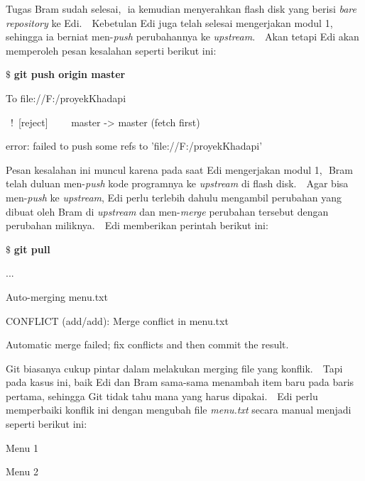 \noindent 
Tugas Bram sudah selesai, $  $ ia kemudian menyerahkan flash disk yang berisi \textit{bare repository} ke Edi. $  $ $  $ Kebetulan Edi juga telah selesai mengerjakan modul 1, sehingga ia berniat men-\textit{push} perubahannya ke \textit{upstream}. $  $ $  $ Akan tetapi Edi akan memperoleh pesan kesalahan seperti berikut ini: \par
\vspace{12pt}
\noindent 
 $  \$  $ \textbf{git push origin master} \par
\noindent 
To file://F:/proyekKhadapi \par
\noindent 
~!~[reject]~~~~   master -> master (fetch first) \par
\noindent 
error: failed to push some refs to 'file://F:/proyekKhadapi' \par
\noindent 
\vspace{12pt}
\noindent 
Pesan kesalahan ini muncul karena pada saat Edi mengerjakan modul 1, $  $ Bram telah duluan men-\textit{push} kode programnya ke \textit{upstream }di flash disk. $  $ $  $ Agar bisa men-\textit{push} ke \textit{upstream}, Edi perlu terlebih dahulu mengambil perubahan yang dibuat oleh Bram di \textit{upstream} dan men-\textit{merge} perubahan tersebut dengan perubahan miliknya. $  $ $  $ Edi memberikan perintah berikut ini: \par
\vspace{12pt}
\noindent 
 $  \$  $ \textbf{git pull} \par
\noindent 
... \par
\noindent 
Auto-merging menu.txt \par
\noindent 
CONFLICT (add/add): Merge conflict in menu.txt \par
\noindent 
Automatic merge failed; fix conflicts and then commit the result. \par
\noindent 
\vspace{12pt}
\noindent 
\vspace{12pt}
\noindent 
Git biasanya cukup pintar dalam melakukan merging file yang konflik. $  $ $  $ Tapi pada kasus ini, baik Edi dan Bram sama-sama menambah item baru pada baris pertama, sehingga Git tidak tahu mana yang harus dipakai. $  $ $  $ Edi perlu memperbaiki konflik ini dengan mengubah file \textit{menu.txt} secara manual menjadi seperti berikut ini: \par
\vspace{12pt}
\vspace{12pt}
\noindent 
Menu 1 \par
\noindent 
Menu 2 \par
